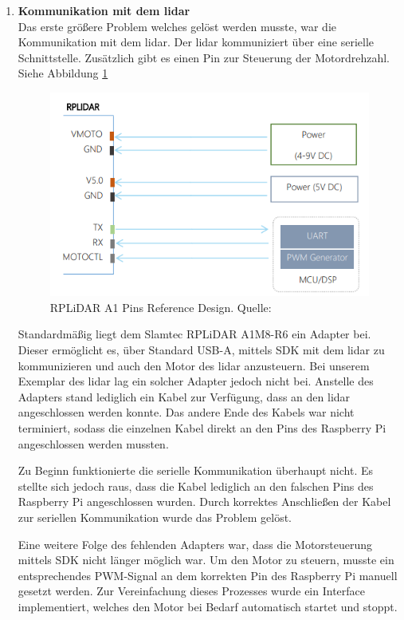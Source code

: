 \begin{enumerate}[leftmargin=*]
    \item \textbf{Kommunikation mit dem \ac{lidar}} \\
    Das erste größere Problem welches gelöst werden musste, war die Kommunikation mit dem \ac{lidar}.
    Der \ac{lidar} kommuniziert über eine serielle Schnittstelle.
    Zusätzlich gibt es einen Pin zur Steuerung der Motordrehzahl. 
    Siehe Abbildung \ref{fig:lidar_pins}

    \begin{figure}[H]
        \centering
        \includegraphics[width=12cm]{graphics/lidar_pin_layout.png}
        \caption{RPLiDAR A1 Pins Reference Design. Quelle: \cite[p. 12]{Slamtec2023} }
        \label{fig:lidar_pins}
    \end{figure}

    Standardmäßig liegt dem Slamtec RPLiDAR A1M8-R6 ein Adapter bei.
    Dieser ermöglicht es, über Standard USB-A, mittels SDK mit dem \ac{lidar} zu kommunizieren und auch den Motor des \ac{lidar} anzusteuern.
    Bei unserem Exemplar des \ac{lidar} lag ein solcher Adapter jedoch nicht bei.
    Anstelle des Adapters stand lediglich ein Kabel zur Verfügung, dass an den \ac{lidar} angeschlossen werden konnte.
    Das andere Ende des Kabels war nicht terminiert, sodass die einzelnen Kabel direkt an den Pins des Raspberry Pi angeschlossen werden mussten.

    Zu Beginn funktionierte die serielle Kommunikation überhaupt nicht.
    Es stellte sich jedoch raus, dass die Kabel lediglich an den falschen Pins des Raspberry Pi angeschlossen wurden.
    Durch korrektes Anschließen der Kabel zur seriellen Kommunikation wurde das Problem gelöst.

    Eine weitere Folge des fehlenden Adapters war, dass die Motorsteuerung mittels SDK nicht länger möglich war.
    Um den Motor zu steuern, musste ein entsprechendes PWM-Signal an dem korrekten Pin des Raspberry Pi manuell gesetzt werden.
    Zur Vereinfachung dieses Prozesses wurde ein Interface implementiert, welches den Motor bei Bedarf automatisch startet und stoppt.


\end{enumerate}
